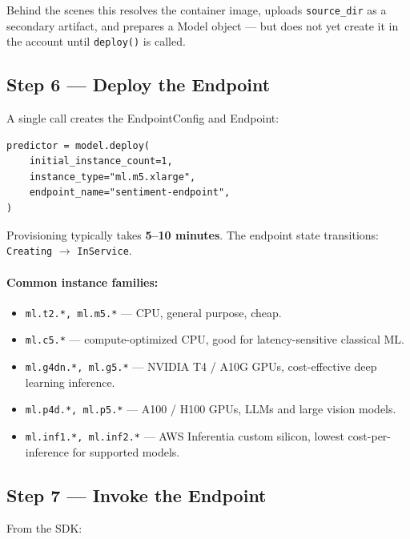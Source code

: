 \documentclass[11pt,a4paper]{article}
\begin{document}
Behind the scenes this resolves the container image, uploads
\texttt{source\_dir} as a secondary artifact, and prepares a Model object ---
but does not yet create it in the account until \texttt{deploy()} is called.

\subsection{Step 6 --- Deploy the Endpoint}

A single call creates the EndpointConfig and Endpoint:

\begin{lstlisting}[style=pycode]
predictor = model.deploy(
    initial_instance_count=1,
    instance_type="ml.m5.xlarge",
    endpoint_name="sentiment-endpoint",
)
\end{lstlisting}

Provisioning typically takes \textbf{5--10 minutes}. The endpoint state
transitions: \texttt{Creating} $\rightarrow$ \texttt{InService}.

\paragraph{Common instance families:}
\begin{itemize}[leftmargin=*,nosep]
    \item \texttt{ml.t2.*, ml.m5.*} --- CPU, general purpose, cheap.
    \item \texttt{ml.c5.*} --- compute-optimized CPU, good for latency-sensitive
          classical ML.
    \item \texttt{ml.g4dn.*, ml.g5.*} --- NVIDIA T4 / A10G GPUs, cost-effective
          deep learning inference.
    \item \texttt{ml.p4d.*, ml.p5.*} --- A100 / H100 GPUs, LLMs and large
          vision models.
    \item \texttt{ml.inf1.*, ml.inf2.*} --- AWS Inferentia custom silicon,
          lowest cost-per-inference for supported models.
\end{itemize}

\subsection{Step 7 --- Invoke the Endpoint}

From the SDK:
\end{document}
